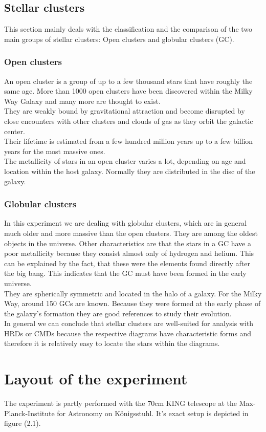  \section{Stellar clusters}
 This section mainly deals with the classification and the comparison of the two main groups of stellar clusters: Open clusters and globular clusters (GC).
 \subsection{Open clusters}
An open cluster is a group of up to a few thousand stars that  have roughly the same age. More than 1000 open clusters have been discovered within the Milky Way Galaxy and many more are thought to exist. \\
  They are weakly bound by gravitational attraction and become disrupted by close encounters with other clusters and clouds of gas as they orbit the galactic center. \\
  Their lifetime is estimated from a few hundred million years up to a few billion years for the most massive ones. \\
  The metallicity of stars in an open cluster varies a lot, depending on age and location within the host galaxy. Normally they are distributed in the disc of the galaxy.
 \subsection{Globular clusters}
 In this experiment we are dealing with globular clusters, which are in general much older and more massive than the open clusters. They are among the oldest objects in the universe. Other characteristics are that the stars in a GC have a poor metallicity because they consist almost only of hydrogen and helium. This can be explained by the fact, that these were the elements found directly after the big bang. This indicates that the GC must have been formed in the early universe. \\
 They are spherically symmetric and located in the halo of a galaxy. For the Milky Way, around 150 GCs are known. Because they were formed at the early phase of the galaxy's formation they are good references to study their evolution.\\
 In general we can conclude that stellar clusters are well-suited for analysis with HRDs or CMDs because the respective diagrams have characteristic forms and therefore it is relatively easy to locate the stars within the diagrams.
 
 \chapter{Layout of the experiment}
 The experiment is partly performed with the 70cm KING telescope at the Max-Planck-Institute for Astronomy on Königsstuhl. It's exact setup is depicted in figure (\color{mydarkblue}2.1\normalcolor).

